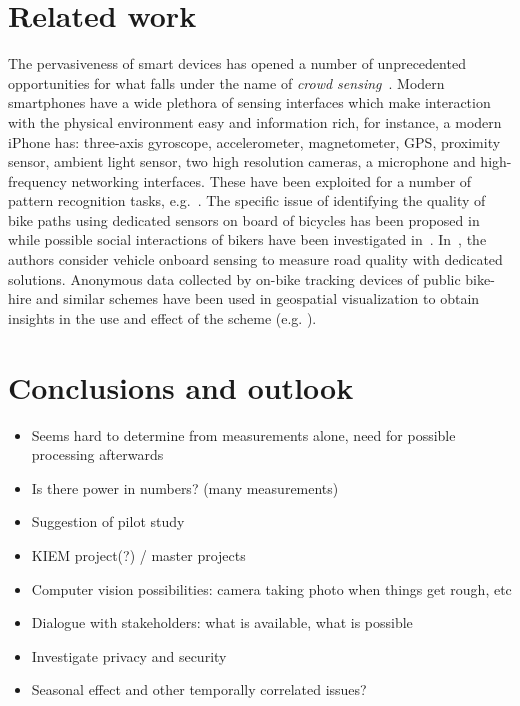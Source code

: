 \documentclass[a4paper,11pt]{article}
\begin{document}
\section{Related work}

The pervasiveness of smart devices has opened a number of unprecedented
opportunities for what falls under the name of \emph{crowd sensing}~\cite{gan:mob11}.
Modern smartphones have a wide plethora of sensing interfaces which make interaction with the physical
environment easy and information rich, for instance, a modern iPhone has: three-axis gyroscope, accelerometer, magnetometer, GPS, proximity
sensor, ambient light sensor, two high resolution cameras, a
microphone and high-frequency networking interfaces. These have been
exploited for a number of pattern recognition tasks, e.g.~\cite{fuj:iph10}. The specific issue of identifying the quality
of bike paths using dedicated sensors on board of bicycles has been
proposed in~\cite{eis:bik07} while possible social interactions of
bikers have been investigated
in~\cite{red:bik10}. In~\cite{eri:pot08}, the authors consider vehicle
onboard sensing to measure road quality with dedicated solutions.
Anonymous data collected by on-bike tracking devices of public bike-hire and similar schemes have been used in geospatial visualization to obtain insights in the use and effect of the scheme (e.g. \cite{krueger2014,wood2010}).

\section{Conclusions and outlook}

\begin{itemize}\setlength{\itemsep}{-3pt}
\item Seems hard to determine from measurements alone, need for possible processing afterwards
\item Is there power in numbers? (many measurements)
\item Suggestion of pilot study
\item KIEM project(?) / master projects
\item Computer vision possibilities: camera taking photo when things get rough, etc
\item Dialogue with stakeholders: what is available, what is possible
\item Investigate privacy and security
\item Seasonal effect and other temporally correlated issues?
\end{itemize}



\end{document}
